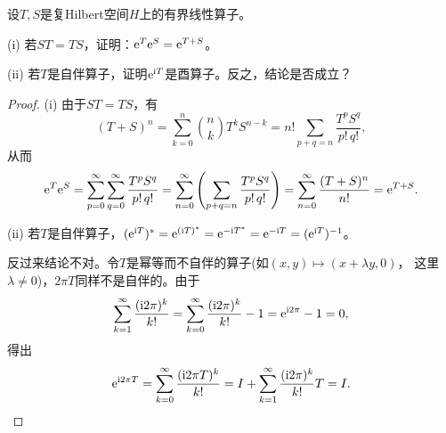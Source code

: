\begin{20}
    设$T,S$是复Hilbert空间$H$上的有界线性算子。

    (i) 若$ST=TS$，证明：${\rm e}^T{\rm e}^S={\rm e}^{T+S}$。

    (ii) 若$T$是自伴算子，证明${\rm e}^{{\rm i}T}$是酉算子。反之，结论是否成立？
\end{20}
\begin{proof}
    (i) 由于$ST=TS$，有
    \[(T+S)^n=\sum_{k=0}^{n}\binom{n}{k}T^kS^{n-k}
    =n!\sum_{p+q=n}\frac{T^pS^q}{p!\,q!},\]
    从而
    \[{\rm e}^T{\rm e}^S=\sum_{p=0}^{\infty}\sum_{q=0}^{\infty}\frac{T^pS^q}{p!\,q!}
    =\sum_{n=0}^{\infty}\left(\sum_{p+q=n}\frac{T^pS^q}{p!\,q!}\right)
    =\sum_{n=0}^{\infty}\frac{(T+S)^n}{n!}={\rm e}^{T+S}.\]

    (ii) 若$T$是自伴算子，$({\rm e}^{{\rm i}T})^*={\rm e}^{({\rm i}T)^*}
    ={\rm e}^{-{\rm i}T^*}={\rm e}^{{-\rm i}T}=({\rm e}^{{\rm i}T})^{-1}$。

    反过来结论不对。令$T$是幂等而不自伴的算子(如$(x,y)\mapsto(x+\lambda y,0)$，
    这里$\lambda\ne0$)，$2\pi T$同样不是自伴的。由于
    \[\sum_{k=1}^\infty\frac{({\rm i}2\pi)^k}{k!}
    =\sum_{k=0}^\infty\frac{({\rm i}2\pi)^k}{k!}-1={\rm e}^{{\rm i}2\pi }-1=0,\]
    得出\[{\rm e}^{{\rm i}2\pi T}=\sum_{k=0}^\infty\frac{({\rm i}2\pi T)^k}{k!}
    =I+\sum_{k=1}^\infty\frac{({\rm i}2\pi)^k}{k!}T=I.\qedhere\]
\end{proof}

